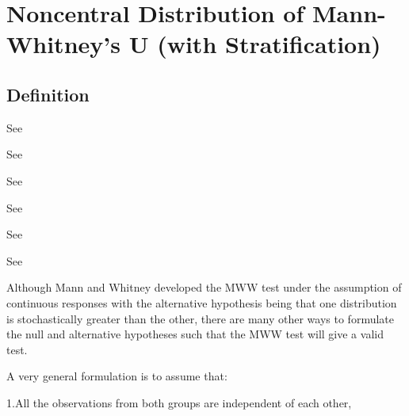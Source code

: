 %
%
%
%
%
%
%
%



\newpage
\section{Noncentral Distribution of Mann-Whitney's U (with Stratification)}


\subsection{Definition}
\label{MannWhitneyUDistributionDefinition}

See \cite{Wang_2003_Rank}

See \cite{Mehrotra_2010}

See \cite{Divine_2010}

See \cite{Zhao_2006}

See \cite{Tang_2011}

See \cite{Zhao_2008}

Although Mann and Whitney developed the MWW test under the assumption of continuous responses with the alternative hypothesis being that one distribution is stochastically greater than the other, there are many other ways to formulate the null and alternative hypotheses such that the MWW test will give a valid test.

A very general formulation is to assume that:

1.All the observations from both groups are independent of each other,

